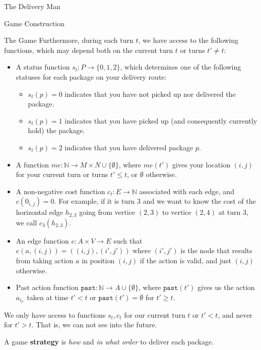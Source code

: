 \begin{section}{The Delivery Man}
\begin{subsection}{Game Construction}
\begin{subsubsection}{The Game}
      Furthermore, during each turn $t$, we have access to the following functions, which may depend both on the current turn $t$ or turns $t' \neq t$:
      \begin{itemize}
      \item A status function $s_t: P \rightarrow \{0,1,2 \}$, which determines one of the following statuses for each package on your delivery route:
        \begin{itemize}
        \item $s_t(p) = 0$ indicates that you have not picked up nor delivered the package.
        \item $s_t(p) = 1$ indicates that you have picked up (and consequently currently hold) the package.
          
        \item $s_t(p) = 2$ indicates that you have delivered package $p$.
        \end{itemize}

      \item A function $me: \mathbb{N} \rightarrow M\times N \cup \{\emptyset \}$, where $me(t')$ gives your location $(i, j)$ for your current turn or turns $t' \leq t$, or $\emptyset$ otherwise.

      \item A non-negative cost function $c_t: E \rightarrow \mathbb{N}$ associated with each edge, and $c(0_{i,j}) = 0$. For example, if it is turn $3$ and we want to know the cost of the horizontal edge $h_{2,3}$ going from vertice $(2, 3)$ to vertice $(2, 4)$ at turn $3$, we call $c_3(h_{2,3})$.

      \item An edge function $e: A\times V \rightarrow E$ such that $e(a, (i,j)) = ((i, j),(i',j'))$ where $(i', j')$ is the node that results from taking action $a$ in position $(i,j)$ if the action is valid, and just $(i, j)$ otherwise.

      \item Past action function $\texttt{past}: \mathbb{N} \rightarrow A\cup \{\emptyset\}$, where $\texttt{past}(t')$ gives us the action $a_{i_{t'}}$ taken at time $t' < t$ or $\texttt{past}(t') = \emptyset$ for $t' \geq t$.
      \end{itemize}

      We only have access to functions $s_t, c_t$ for our current turn $t$ or $t' < t$, and never for $t' > t$. That is, we can not see into the future.
      
      A game \textbf{strategy} is \textit{how} and \textit{in what order} to deliver each package.


\end{subsubsection}
\end{subsection}
\end{section}
